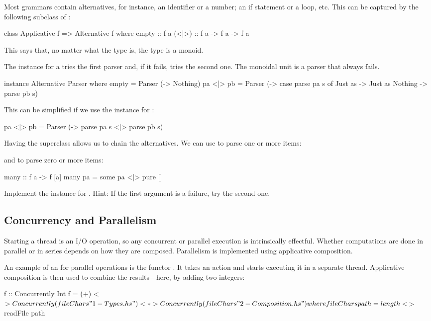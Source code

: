 \documentclass[DaoFP]{subfiles}
\begin{document}
Most grammars contain alternatives, for instance, an identifier or a number; an if statement or a loop, etc. This can be captured by the following subclass of :
\begin{haskell}
class Applicative f => Alternative f where
  empty :: f a
  (<|>) :: f a -> f a -> f a
\end{haskell}
This says that, no matter what the type  is, the type  is a monoid. 

The  instance for a  tries the first parser and, if it fails, tries the second one. The monoidal unit is a parser that always fails.
\begin{haskell}
instance Alternative Parser where
  empty = Parser (\s -> Nothing)
  pa <|> pb = Parser (\s ->
    case parse pa s of
      Just as -> Just as
      Nothing -> parse pb s)
 \end{haskell}
 This can be simplified if we use the  instance for :
\begin{haskell}
  pa <|> pb = Parser (\s -> parse pa s <|> parse pb s)
 \end{haskell}
 Having the  superclass allows us to chain the alternatives. We can use  to parse one or more items:
and  to parse zero or more items:
\begin{haskell}
many :: f a -> f [a]
many pa = some pa <|> pure []
\end{haskell}

\begin{exercise}
Implement the  instance for . Hint: If the first argument is a failure, try the second one.
\end{exercise}

\subsection{Concurrency and Parallelism}

Starting a thread is an I/O operation, so any concurrent or parallel execution is intrinsically effectful. Whether computations are done in parallel or in series depends on how they are composed. Parallelism is implemented using applicative composition. 

An example of an  for parallel operations is the functor . It takes an  action and starts executing it in a separate thread. Applicative composition is then used to combine the results---here, by adding two integers:
\begin{haskell}
f :: Concurrently Int
f = (+) <$> Concurrently (fileChars "1-Types.hs") 
        <*> Concurrently (fileChars "2-Composition.hs")
    where fileChars path = length <$> readFile path
\end{haskell}
\end{document}
